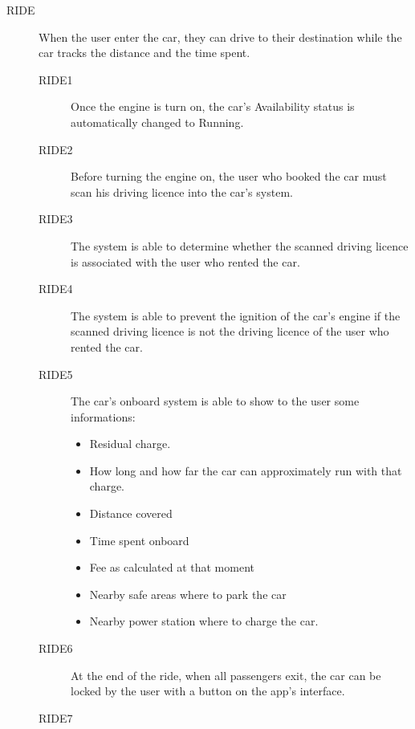 \documentclass[11pt]{article} %
\begin{document}
\begin{description}
	\item[RIDE] When the user enter the car, they can drive to their destination while the car tracks the distance and the time spent.
	\begin{description}
	\item[RIDE1] Once the engine is turn on, the car's Availability status is automatically changed to Running.
	\item[RIDE2] Before turning the engine on, the user who booked the car must scan his driving licence into the car's system.
	\item[RIDE3] The system is able to determine whether the scanned driving licence is associated with the user who rented the car.
	\item[RIDE4] The system is able to prevent the ignition of the car's engine if the scanned driving licence is not the driving licence of the user who rented the car.
	\item[RIDE5] The car's onboard system is able to show to the user some informations:
		\begin{itemize}
		\item Residual charge.
		\item How long and how far the car can approximately run with that charge.
		\item Distance covered
		\item Time spent onboard
		\item Fee as calculated at that moment
		\item Nearby safe areas where to park the car
		\item Nearby power station where to charge the car.
		\end{itemize}
	\item[RIDE6] At the end of the ride, when all passengers exit, the car can be locked by the user
 with a button on the app's interface.
 	\item[RIDE7] 
	\end{description}


\end{description}
\end{document}
